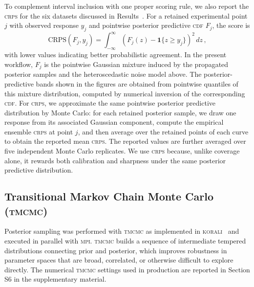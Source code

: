 \documentclass[%
 aip,
 jcp,
 amsmath,amssymb,
 preprint,%
]{revtex4-1}
\begin{document}
\noindent To complement interval inclusion with one proper scoring rule, we also report the \textsc{crps} for the six datasets discussed in Results~\citep{gneiting2007strictly,gneiting2007probabilistic,hersbach2000decomposition}. For a retained experimental point $j$ with observed response $y_j$ and pointwise posterior predictive \textsc{cdf} $F_j$, the score is
\begin{equation}
\mathrm{CRPS}(F_j,y_j)=\int_{-\infty}^{\infty}\left(F_j(z)-\mathbf{1}\{z\ge y_j\}\right)^2\,dz \, ,
\end{equation}
with lower values indicating better probabilistic agreement. In the present workflow, $F_j$ is the pointwise Gaussian mixture induced by the propagated posterior samples and the heteroscedastic noise model above. The posterior-predictive bands shown in the figures are obtained from pointwise quantiles of this mixture distribution, computed by numerical inversion of the corresponding \textsc{cdf}. For \textsc{crps}, we approximate the same pointwise posterior predictive distribution by Monte Carlo: for each retained posterior sample, we draw one response from its associated Gaussian component, compute the empirical ensemble \textsc{crps} at point $j$, and then average over the retained points of each curve to obtain the reported mean \textsc{crps}. The reported values are further averaged over five independent Monte Carlo replicates. We use \textsc{crps} because, unlike coverage alone, it rewards both calibration and sharpness under the same posterior predictive distribution.

\subsection{Transitional Markov Chain Monte Carlo (\textsc{tmcmc})}
\label{sec:meth:tmcmc}

\noindent Posterior sampling was performed with \textsc{tmcmc} as implemented in \textsc{korali}~\citep{martin2022korali} and executed in parallel with \textsc{mpi}. \textsc{tmcmc} builds a sequence of intermediate tempered distributions connecting prior and posterior, which improves robustness in parameter spaces that are broad, correlated, or otherwise difficult to explore directly. The numerical \textsc{tmcmc} settings used in production are reported in Section S6 in the supplementary material.



\end{document}
